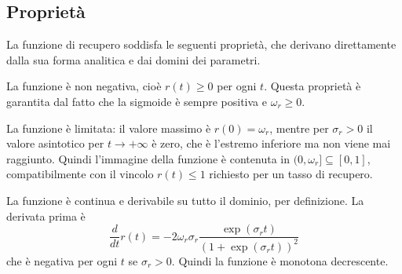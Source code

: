 \subsection{Proprietà}

La funzione di recupero soddisfa le seguenti proprietà, che derivano direttamente dalla sua forma analitica e dai domini dei parametri. \par

La funzione è non negativa, cioè $r(t) \geq 0$ per ogni $t$. Questa proprietà è garantita dal fatto che la sigmoide è sempre positiva e $\omega_r \geq 0$. \par

La funzione è limitata: il valore massimo è $r(0) = \omega_r$, mentre per $\sigma_r > 0$ il valore asintotico per $t \to +\infty$ è zero, che è l'estremo inferiore ma non viene mai raggiunto. Quindi l'immagine della funzione è contenuta in $(0, \omega_r] \subseteq [0, 1]$, compatibilmente con il vincolo $r(t) \leq 1$ richiesto per un tasso di recupero. \par

La funzione è continua e derivabile su tutto il dominio, per definizione. La derivata prima è
\[
    \frac{d}{dt} r(t) = -2 \omega_r \sigma_r \frac{\exp\left(\sigma_r t\right)}{\left(1 + \exp\left(\sigma_r t\right)\right)^2}
\]
che è negativa per ogni $t$ se $\sigma_r > 0$. Quindi la funzione è monotona decrescente.